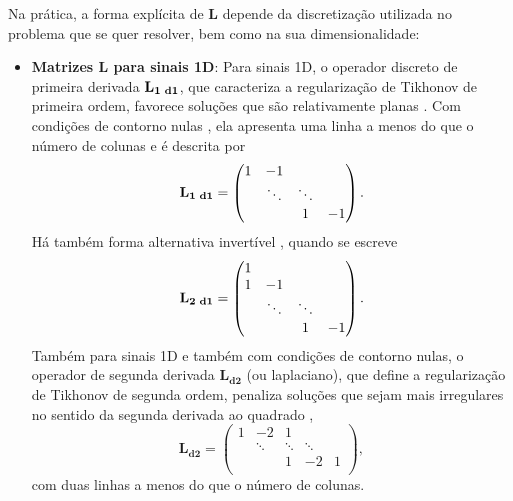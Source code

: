 Na prática, a forma explícita de $\mathbf{L}$ depende da discretização utilizada no problema que se quer resolver, bem como na sua dimensionalidade:
\begin{itemize}

\item \textbf{Matrizes $\mathbf{L}$ para sinais 1D}: Para sinais 1D, o operador discreto de primeira derivada $\mathbf{L_{1 \hspace{1mm} d1}}$, que caracteriza a regularização de Tikhonov de primeira ordem, favorece soluções que são relativamente planas \cite[pág. 103]{aster2019parameter}. Com condições de contorno nulas \cite[págs. 175-6]{hansen2010discrete},  ela apresenta uma linha a menos do que o número de colunas e é descrita por
\begin{equation}
\mathbf{L_{1 \hspace{1mm} d1}} = \begin{pmatrix}
1 & -1 & & \\
& \ddots & \ddots & \\
& & 1 & -1 \\ 
\end{pmatrix}.
\label{eq:ld1} 
\end{equation}
Há também forma alternativa invertível \cite[pág. 115]{calvetti2007introduction}, quando se escreve
\begin{equation}
\mathbf{L_{2 \hspace{1mm} d1}} = \begin{pmatrix}
1 & & \\
1 & -1 & & \\
& \ddots & \ddots & \\
& & 1 & -1 \\ 
\end{pmatrix}.
\label{eq:ld1alt} 
\end{equation}
Também para sinais 1D e também com condições de contorno nulas, o operador de segunda derivada $\mathbf{L_{d2}}$  (ou laplaciano), que define a regularização de Tikhonov de segunda ordem, penaliza soluções que sejam mais irregulares no sentido da segunda derivada ao quadrado  \cite[pág. 104]{aster2019parameter},
\begin{equation}
\mathbf{L_{d2}} = \begin{pmatrix}
1 & -2 & 1 & & \\
& \ddots & \ddots & \ddots & \\
& & 1 & -2 & 1 \\
\end{pmatrix}, 
\label{eq:ld2}
\end{equation}
com duas linhas a menos do que o número de colunas. 


\end{itemize}
